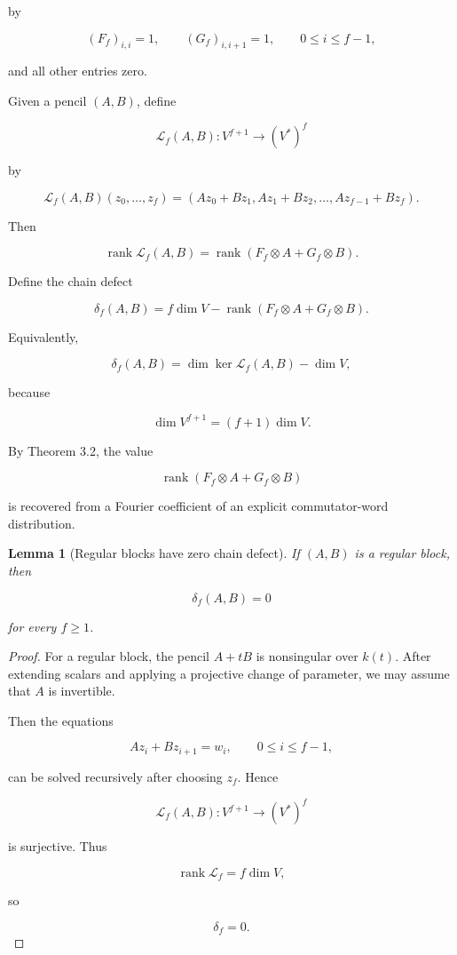 \documentclass[11pt]{article}
\newtheorem{lemma}[theorem]{Lemma}
\begin{document}
by

\[
(F_f)_{i,i}=1,
\qquad
(G_f)_{i,i+1}=1,
\qquad
0\le i\le f-1,
\]

and all other entries zero.

Given a pencil $(A,B)$, define

\[
\mathcal L_f(A,B):V^{f+1}\to(V^*)^f
\]

by

\[
\mathcal L_f(A,B)(z_0,\ldots,z_f)
=
(Az_0+Bz_1,
Az_1+Bz_2,
\ldots,
Az_{f-1}+Bz_f).
\]

Then

\[
\operatorname{rank}\mathcal L_f(A,B)
=
\operatorname{rank}(F_f\otimes A+G_f\otimes B).
\]

Define the chain defect

\[
\boxed{
\delta_f(A,B)
=
f\dim V-\operatorname{rank}(F_f\otimes A+G_f\otimes B).
}
\]

Equivalently,

\[
\delta_f(A,B)
=
\dim\ker \mathcal L_f(A,B)-\dim V,
\]

because

\[
\dim V^{f+1}=(f+1)\dim V.
\]

By Theorem 3.2, the value

\[
\operatorname{rank}(F_f\otimes A+G_f\otimes B)
\]

is recovered from a Fourier coefficient of an explicit commutator-word distribution.

\begin{lemma}[Regular blocks have zero chain defect]

If $(A,B)$ is a regular block, then

\[
\delta_f(A,B)=0
\]

for every $f\ge1$.

\end{lemma}

\begin{proof}

For a regular block, the pencil $A+tB$ is nonsingular over $k(t)$. After extending scalars and applying a projective change of parameter, we may assume that $A$ is invertible.

Then the equations

\[
Az_i+Bz_{i+1}=w_i,\qquad 0\le i\le f-1,
\]

can be solved recursively after choosing $z_f$. Hence

\[
\mathcal L_f(A,B):V^{f+1}\to(V^*)^f
\]

is surjective. Thus

\[
\operatorname{rank}\mathcal L_f=f\dim V,
\]

so

\[
\delta_f=0.
\]

\end{proof}
\end{document}
